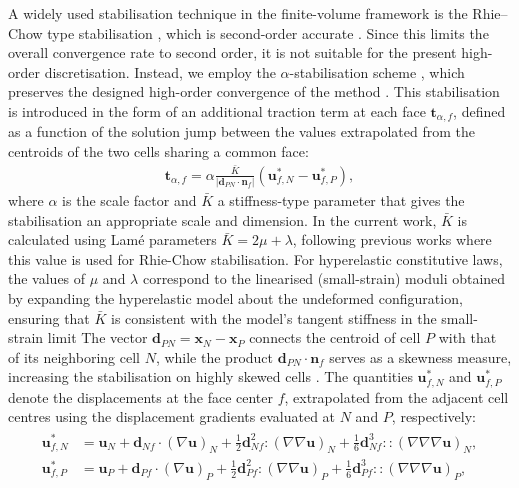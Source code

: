\documentclass[review,3p]{elsarticle}
\newcommand{\bb}{\boldsymbol}
\begin{document}
A widely used stabilisation technique in the finite-volume framework is the Rhie–Chow type stabilisation \cite{Rhie1983}, which is second-order accurate \cite{Cardiff2026}.
Since this limits the overall convergence rate to second order, it is not suitable for the present high-order discretisation.
Instead, we employ the $\alpha$-stabilisation scheme \cite{Nishikawa2010}, which preserves the designed high-order convergence of the method \cite{Nishikawa2011, Nishikawa2025a}.
This stabilisation is introduced in the form of an additional traction term at each face $\bb{t}_{\alpha, f}$, defined as a function of the solution jump between the values extrapolated from the centroids of the two cells sharing a common face:
\begin{eqnarray}\label{eq:alpha}
	\bb{t}_{\alpha, f} = \alpha \frac{\bar{K}}{|\bb{d}_{PN} \cdot \bb{n}_f|}(\bb{u}_{f,N}^*-\bb{u}_{f,P}^*),
\end{eqnarray}
%
where $\alpha$ is the scale factor and $\bar{K}$ a stiffness-type parameter that gives the stabilisation an appropriate scale and dimension.
In the current work, $\bar{K}$ is calculated using Lamé parameters $\bar{K} = 2\mu +\lambda$, following previous works \cite{Cardiff2017,Cardiff2018,Tukovic2013} where this value is used for Rhie-Chow stabilisation.
For hyperelastic constitutive laws, the values of $\mu$ and $\lambda$ correspond to the linearised (small-strain) moduli obtained by expanding the hyperelastic model about the undeformed configuration, ensuring that $\bar{K}$ is consistent with the model’s tangent stiffness in the small-strain limit
The vector $\bb{d}_{PN}=\bb{x}_N-\bb{x}_P$ connects the centroid of cell $P$ with that of its neighboring cell $N$,
while the product $\bb{d}_{PN} \cdot \bb{n}_f$ serves as a skewness measure, increasing the stabilisation on highly skewed cells \cite{Nishikawa2011}.
The quantities $\bb{u}_{f,N}^*$ and $\bb{u}_{f,P}^*$ denote the displacements at the face center $f$,
extrapolated from the adjacent cell centres using the displacement gradients evaluated at $N$ and $P$, respectively:
\begin{eqnarray}\label{eq:alphaJump}
	\begin{split}
		\bb{u}_{f,N}^* &= \bb{u}_N + \bb{d}_{Nf} \cdot (\nabla \bb{u})_N + \frac{1}{2}\bb{d}_{Nf}^2 \!:\! (\nabla \nabla \bb{u})_N + \frac{1}{6}\bb{d}_{Nf}^3 \!::\! (\nabla \nabla \nabla \bb{u})_N, \\
		\bb{u}_{f,P}^*& = \bb{u}_P + \bb{d}_{Pf} \cdot (\nabla \bb{u})_P + \frac{1}{2}\bb{d}_{Pf}^2 \!:\! (\nabla \nabla \bb{u})_P + \frac{1}{6}\bb{d}_{Pf}^3 \!::\! (\nabla \nabla \nabla \bb{u})_P,
	\end{split}
\end{eqnarray}
\end{document}
